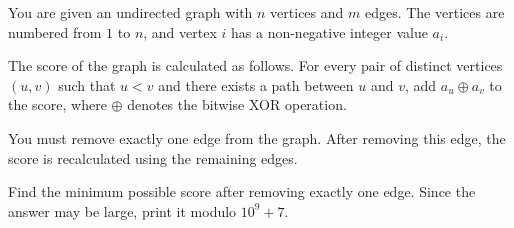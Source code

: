 You are given an undirected graph with $n$ vertices and $m$ edges. The vertices are numbered from $1$ to $n$, and vertex $i$ has a non-negative integer value $a_i$.

The score of the graph is calculated as follows. For every pair of distinct vertices $(u, v)$ such that $u < v$ and there exists a path between $u$ and $v$, add $a_u \oplus a_v$ to the score, where $\oplus$ denotes the bitwise XOR operation.

You must remove exactly one edge from the graph. After removing this edge, the score is recalculated using the remaining edges.

Find the minimum possible score after removing exactly one edge. Since the answer may be large, print it modulo $10^9 + 7$.